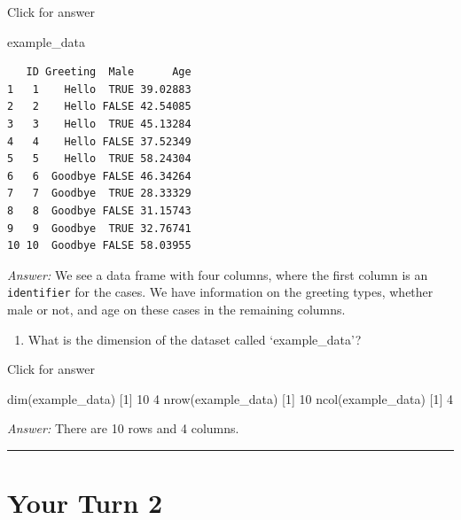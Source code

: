 \documentclass[
]{book}
\newenvironment{Shaded}{\begin{snugshade}}{\end{snugshade}}
\newcommand{\DecValTok}[1]{\textcolor[rgb]{0.00,0.00,0.81}{#1}}
\newcommand{\FunctionTok}[1]{\textcolor[rgb]{0.00,0.00,0.00}{#1}}
\newcommand{\NormalTok}[1]{#1}
\providecommand{\tightlist}{%
  \setlength{\itemsep}{0pt}\setlength{\parskip}{0pt}}
\begin{document}
Click for answer

\begin{Shaded}
\begin{Highlighting}[]
\NormalTok{example\_data}
\end{Highlighting}
\end{Shaded}

\begin{verbatim}
   ID Greeting  Male      Age
1   1    Hello  TRUE 39.02883
2   2    Hello FALSE 42.54085
3   3    Hello  TRUE 45.13284
4   4    Hello FALSE 37.52349
5   5    Hello  TRUE 58.24304
6   6  Goodbye FALSE 46.34264
7   7  Goodbye  TRUE 28.33329
8   8  Goodbye FALSE 31.15743
9   9  Goodbye  TRUE 32.76741
10 10  Goodbye FALSE 58.03955
\end{verbatim}

\emph{Answer:} We see a data frame with four columns, where the first column is an \texttt{identifier} for the cases. We have information on the greeting types, whether male or not, and age on these cases in the remaining columns.

\begin{enumerate}
\def\labelenumi{\alph{enumi}.}
\setcounter{enumi}{1}
\tightlist
\item
  What is the dimension of the dataset called `example\_data'?
\end{enumerate}

Click for answer

\begin{Shaded}
\begin{Highlighting}[]
\FunctionTok{dim}\NormalTok{(example\_data)}
\NormalTok{[}\DecValTok{1}\NormalTok{] }\DecValTok{10}  \DecValTok{4}
\FunctionTok{nrow}\NormalTok{(example\_data)}
\NormalTok{[}\DecValTok{1}\NormalTok{] }\DecValTok{10}
\FunctionTok{ncol}\NormalTok{(example\_data)}
\NormalTok{[}\DecValTok{1}\NormalTok{] }\DecValTok{4}
\end{Highlighting}
\end{Shaded}

\emph{Answer:} There are 10 rows and 4 columns.

\begin{center}\rule{0.5\linewidth}{0.5pt}\end{center}

\hypertarget{your-turn-2}{%
\section{Your Turn 2}\label{your-turn-2}}
\end{document}
